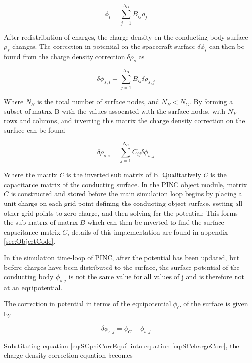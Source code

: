 \begin{equation}
    \phi_i = \sum^{N_G}_{j=1} B_{ij} \rho_j
\end{equation}


After redistribution of charges, the charge density on the conducting body surface $\rho_s$ changes. The correction in potential on the spacecraft surface $\delta \phi_s$ can then be found from the charge density correction $\delta \rho_s$ as

\begin{equation}
    \delta \phi_{s,i} = \sum^{N_B}_{j=1} B_{ij} \delta \rho_{s,j}
\end{equation}

Where $N_B$ is the total number of surface nodes, and $N_B < N_G$. By forming a subset of matrix B with the values associated with the surface nodes, with $N_B$ rows and columns, and inverting this matrix the charge density correction on the surface can be found

\begin{equation}\label{eq:SCchargeCorr}
    \delta \rho_{s,i} = \sum^{N_B}_{j=1} C_{ij} \delta \phi_{s,j}
\end{equation}

Where the matrix $C$ is the inverted sub matrix of B. Qualitatively $C$ is the capacitance matrix of the conducting surface. In the PINC object module, matrix $C$ is constructed and stored before the main simulation loop begins by placing a unit charge on each grid point defining the conducting object surface, setting all other grid points to zero charge, and then solving for the potential: This forms the sub matrix of matrix $B$ which can then be inverted to find the surface capacitance matrix $C$, details of this implementation are found in appendix \ref{sec:ObjectCode}.

In the simulation time-loop of PINC, after the potential has been updated, but before charges have been distributed to the surface, the surface potential of the conducting body $\phi_{s,j}$ is not the same value for all values of j and is therefore not at an equipotential. 

The correction in potential in terms of the equipotential $\phi_C$ of the surface is given by

\begin{equation}\label{eq:SCphiCorrEqui}
    \delta \phi_{s,j} = \phi_C - \phi_{s,j}
\end{equation}

Substituting equation \ref{eq:SCphiCorrEqui} into equation \ref{eq:SCchargeCorr}, the charge density correction equation becomes

